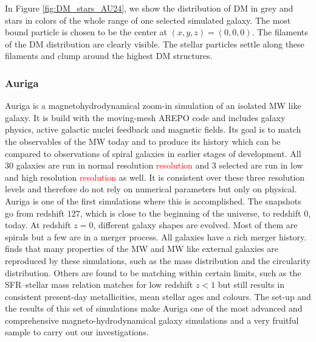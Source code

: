 In Figure \ref{fig:DM_stars_AU24}, we show the distribution of \ac{DM} in grey and stars in colors of the whole range of one selected simulated galaxy. The most bound particle is chosen to be the center at $(x,y,z) = (0,0,0)$. The filaments of the \ac{DM} distribution are clearly visible. The stellar particles settle along these filaments and clump around the highest \ac{DM} structures. 

\subsubsection{Auriga}\label{subsubsec:auriga_intro}
Auriga is a magnetohydrodynamical zoom-in simulation of an isolated \ac{MW} like galaxy. It is build with the moving-mesh AREPO \citep{AREPO} code and includes galaxy physics, active galactic nuclei feedback and magnetic fields. Its goal is to match the observables of the \ac{MW} today and to produce its history which can be compared to observations of spiral galaxies in earlier stages of development. All 30 galaxies are run in normal resolution \textcolor{red}{resolution} and 3 selected are run in low and high resolution \textcolor{red}{resolution} as well. It is consistent over these three resolution levels and therefore do not rely on numerical parameters but only on physical. Auriga is one of the first simulations where this is accomplished. The snapshots go from redshift $127$, which is close to the beginning of the universe, to redshift $0$, today.  At redshift $z= 0$, different galaxy shapes are evolved. Most of them are spirals but a few are in a merger process. All galaxies have a rich merger history. \citep{AurigaGrand} finds that many properties of the \ac{MW} and \ac{MW} like external galaxies are reproduced by these simulations, such as the mass distribution and the circularity distribution. Others are found to be matching within certain limits, such as the SFR–stellar mass relation matches for low redshift $z<1$ but still results in consistent present-day metallicities, mean stellar ages and colours. The set-up and the results of this set of simulations make Auriga one of the most advanced and comprehensive magneto-hydrodynamical galaxy simulations and a very fruitful sample to carry out our investigations. \\
